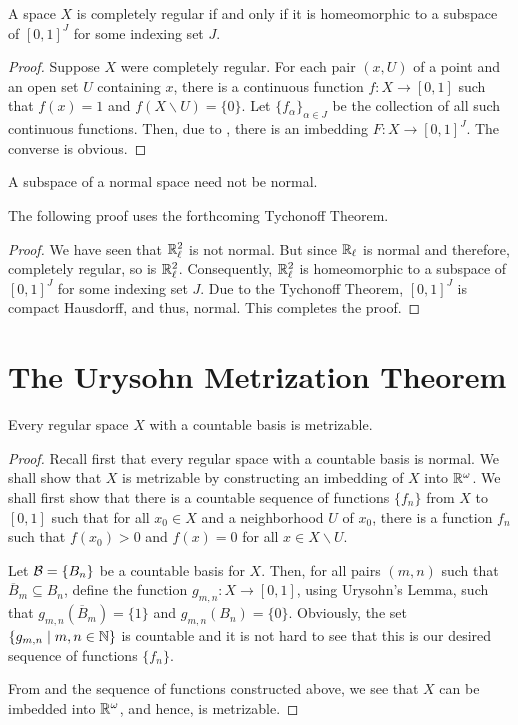 \begin{corollary}
    A space $X$ is completely regular if and only if it is homeomorphic to a subspace of $[0,1]^J$ for some indexing set $J$.
\end{corollary}
\begin{proof}
    Suppose $X$ were completely regular. For each pair $(x,U)$ of a point and an open set $U$ containing $x$, there is a continuous function $f: X\to[0,1]$ such that $f(x) = 1$ and $f(X\backslash U) = \{0\}$. Let $\{f_\alpha\}_{\alpha\in J}$ be the collection of all such continuous functions. Then, due to , there is an imbedding $F: X\to[0,1]^J$. The converse is obvious.
\end{proof}

\begin{proposition}
    A subspace of a normal space need not be normal.
\end{proposition}
The following proof uses the forthcoming Tychonoff Theorem.
\begin{proof}
    We have seen that $\mathbb{R}_\ell^2$ is not normal. But since $\mathbb{R}_\ell$ is normal and therefore, completely regular, so is $\mathbb{R}_\ell^2$. Consequently, $\mathbb{R}_\ell^2$ is homeomorphic to a subspace of $[0,1]^J$ for some indexing set $J$. Due to the Tychonoff Theorem, $[0,1]^J$ is compact Hausdorff, and thus, normal. This completes the proof.
\end{proof}

\section{The Urysohn Metrization Theorem}


\begin{theorem}
    Every regular space $X$ with a countable basis is metrizable.
\end{theorem}
\begin{proof}
    Recall first that every regular space with a countable basis is normal.
    We shall show that $X$ is metrizable by constructing an imbedding of $X$ into $\mathbb{R}^\omega$. We shall first show that there is a countable sequence of functions $\{f_n\}$ from $X$ to $[0,1]$ such that for all $x_0\in X$ and a neighborhood $U$ of $x_0$, there is a function $f_n$ such that $f(x_0) > 0$ and $f(x)=0$ for all $x\in X\backslash U$.

    Let $\mathcal{B} = \{B_n\}$ be a countable basis for $X$. Then, for all pairs $(m, n)$ such that $\overline{B}_m\subseteq B_n$, define the function $g_{m,n}:X\to[0,1]$, using Urysohn's Lemma, such that $g_{m,n}(\overline{B}_m) = \{1\}$ and $g_{m,n}(B_n) = \{0\}$. Obviously, the set $\{g_{m,n}\mid m,n\in\mathbb{N}\}$ is countable and it is not hard to see that this is our desired sequence of functions $\{f_n\}$.

    From  and the sequence of functions constructed above, we see that $X$ can be imbedded into $\mathbb{R}^\omega$, and hence, is metrizable.
\end{proof}

